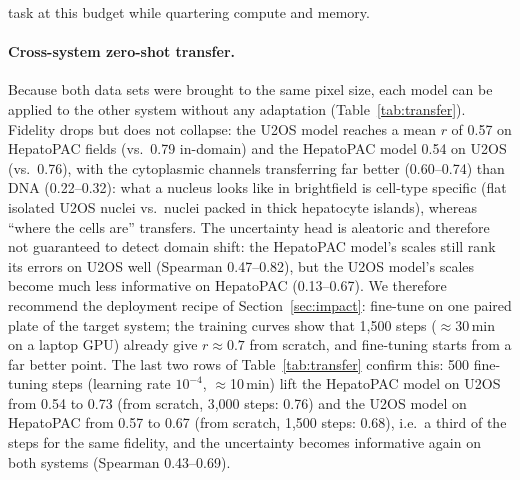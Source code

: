 \documentclass[11pt,a4paper]{article}
\begin{document}
task at this budget while quartering compute and memory. \paragraph{Cross-system zero-shot transfer.} Because both data sets were brought to the same pixel size, each model can be applied to the other system without any adaptation (Table~\ref{tab:transfer}). Fidelity drops but does not collapse: the U2OS model reaches a mean $r$ of 0.57 on HepatoPAC fields (vs.\ 0.79 in-domain) and the HepatoPAC model 0.54 on U2OS (vs.\ 0.76), with the cytoplasmic channels transferring far better (0.60--0.74) than DNA (0.22--0.32): what a nucleus looks like in brightfield is cell-type specific (flat isolated U2OS nuclei vs.\ nuclei packed in thick hepatocyte islands), whereas ``where the cells are'' transfers. The uncertainty head is aleatoric and therefore not guaranteed to detect domain shift: the HepatoPAC model's scales still rank its errors on U2OS well (Spearman 0.47--0.82), but the U2OS model's scales become much less informative on HepatoPAC (0.13--0.67). We therefore recommend the deployment recipe of Section~\ref{sec:impact}: fine-tune on one paired plate of the target system; the training curves show that 1,500 steps ($\approx$30\,min on a laptop GPU) already give $r \approx 0.7$ from scratch, and fine-tuning starts from a far better point. The last two rows of Table~\ref{tab:transfer} confirm this: 500 fine-tuning steps (learning rate $10^{-4}$, $\approx$10\,min) lift the HepatoPAC model on U2OS from 0.54 to 0.73 (from scratch, 3,000 steps: 0.76) and the U2OS model on HepatoPAC from 0.57 to 0.67 (from scratch, 1,500 steps: 0.68), i.e.\ a third of the steps for the same fidelity, and the uncertainty becomes informative again on both systems (Spearman 0.43--0.69).
\end{document}
